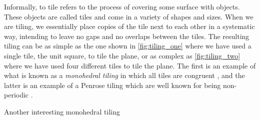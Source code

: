 \documentclass[../thesis.tex]{subfiles}
\begin{document}





Informally, to tile refers to the process of covering some surface with objects. These objects are called tiles and come in a variety of shapes and sizes. When we are tiling, we essentially place copies of the tile next to each other in a systematic way, intending to leave no gaps and no overlaps between the tiles. The resulting tiling can be as simple as the one shown in \cref{fig:tiling_one} where we have used a single tile, the unit square, to tile the plane, or as complex as \cref{fig:tiling_two} where we have used four different tiles to tile the plane. The first is an example of what is known as a \emph{monohedral tiling} in which all tiles are congruent \cite[p. 20]{grunbaumTilingsPatterns1987}, and the latter is an example of a Penrose tiling which are well known for being non-periodic \cite{penrosePentaplexityClassNonPeriodic1979}. %




Another interesting monohedral tiling 

\end{document}
